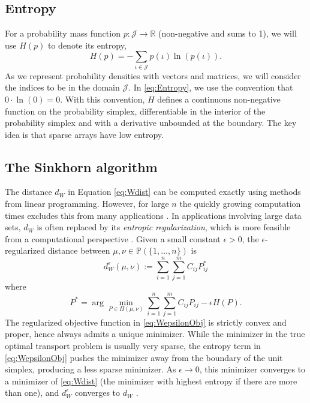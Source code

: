 \documentclass[conference]{IEEEtran}
\newcommand{\R}{{\mathbb{R}}}
\newcommand{\bbP}{{\mathbb{P}}}
\begin{document}
\subsection{Entropy}\label{sec:Entropy}
For a probability mass function $p:\mathcal J\rightarrow \R$ (non-negative and sums to 1), we will use $H(p)$ to denote its entropy,
\begin{equation} 
    H(p) = -\sum_{\iota \in \mathcal J} p(\iota) \ln(p(\iota)) \label{eq:Entropy}. 
\end{equation}
As we represent probability densities with vectors and matrices, we will consider the indices to be in the domain $\mathcal J$.
In \eqref{eq:Entropy}, we use the convention that $0\cdot\ln(0) = 0$. With this convention, $H$ defines a continuous non-negative function on the probability simplex, differentiable in the interior of the probability simplex and with a derivative unbounded at the boundary. The key idea is that sparse arrays have low entropy.


\subsection{The Sinkhorn algorithm}\label{sec:Sinkhorn}

The distance $d_W$ in Equation \eqref{eq:Wdist} 
can be computed exactly using methods from linear programming. However, for large $n$ the quickly growing computation times excludes this from many applications \cite{cuturi}. In applications involving large data sets, $d_W$ is often replaced by its \emph{entropic regularization}, which is more feasible from a computational perspective \cite{peyre}. Given a small constant $\epsilon>0$, the $\epsilon$-regularized distance between $\mu,\nu\in \bbP(\{1,\ldots,n\})$ is 
\begin{equation} \label{eq:Wepsilon}
    d_W^\epsilon(\mu,\nu) := \sum_{i=1}^n \sum_{j=1}^m C_{ij}P^*_{ij}
\end{equation}
where 
\begin{equation}
    P^* = \arg\min_{P\in \Pi(\mu,\nu)} \sum_{i=1}^n \sum_{j=1}^m C_{ij}P_{ij} - \epsilon H(P).
    \label{eq:WepsilonObj}
\end{equation}
The regularized objective function in \eqref{eq:WepsilonObj} is strictly convex and proper, hence always admits a unique minimizer. While the minimizer in the true optimal transport problem is usually very sparse, the entropy term in \eqref{eq:WepsilonObj} pushes the minimizer away from the boundary of the unit simplex, producing a less sparse minimizer. As $\epsilon\rightarrow 0$, this minimizer converges to a minimizer of \eqref{eq:Wdist} (the minimizer with highest entropy if there are more than one), and $d_W^\epsilon$ converges to $d_W$ \cite{peyre}. 
\end{document}

